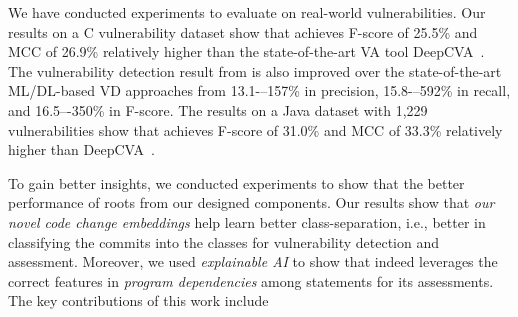 

We have conducted experiments to evaluate {\tool} on real-world
vulnerabilities. Our results on a C vulnerability dataset
show that {\tool} achieves F-score of 25.5\% and MCC of 26.9\%
relatively higher than the state-of-the-art VA tool
DeepCVA~\cite{deepCVA-ase21}.  The vulnerability detection result from
{\tool} is also improved over the state-of-the-art ML/DL-based VD
approaches from 13.1-–157\% in precision, 15.8-–592\% in recall,
and 16.5–-350\% in F-score.
The results on a Java dataset with 1,229 vulnerabilities show that
{\tool} achieves F-score of 31.0\% and MCC of 33.3\% relatively higher
than DeepCVA~\cite{deepCVA-ase21}.


To gain better insights, we conducted experiments to show that the better
performance of {\tool} roots from our designed components.
Our results show that {\em our novel code change embeddings} help
{\tool} learn better class-separation, i.e., better in classifying the
commits into the classes for vulnerability detection and
assessment. Moreover, we used {\em explainable AI} to show
that {\tool} indeed leverages the correct features in {\em program
  dependencies} among statements for its assessments.
The key contributions of this work include

